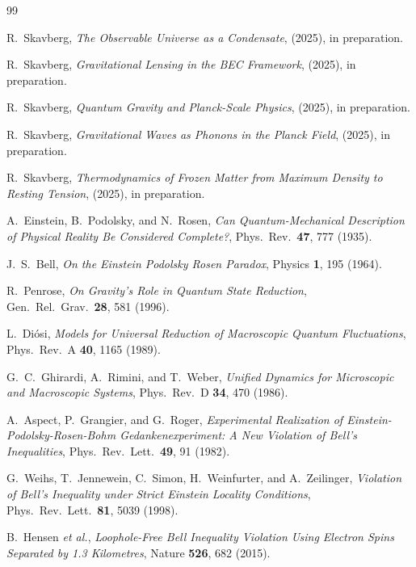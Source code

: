 \documentclass[11pt,a4paper]{article}
\theoremstyle{definition}
\theoremstyle{remark}
\begin{document}
\begin{thebibliography}{99}

R.~Skavberg,
\textit{The Observable Universe as a Condensate},
(2025), in preparation.

R.~Skavberg,
\textit{Gravitational Lensing in the BEC Framework},
(2025), in preparation.

R.~Skavberg,
\textit{Quantum Gravity and Planck-Scale Physics},
(2025), in preparation.

R.~Skavberg,
\textit{Gravitational Waves as Phonons in the Planck Field},
(2025), in preparation.

R.~Skavberg,
\textit{Thermodynamics of Frozen Matter from Maximum Density to Resting Tension},
(2025), in preparation.

A.~Einstein, B.~Podolsky, and N.~Rosen,
\textit{Can Quantum-Mechanical Description of Physical Reality Be Considered Complete?},
Phys.\ Rev.\ \textbf{47}, 777 (1935).

J.~S.~Bell,
\textit{On the Einstein Podolsky Rosen Paradox},
Physics \textbf{1}, 195 (1964).

R.~Penrose,
\textit{On Gravity's Role in Quantum State Reduction},
Gen.\ Rel.\ Grav.\ \textbf{28}, 581 (1996).

L.~Di\'osi,
\textit{Models for Universal Reduction of Macroscopic Quantum Fluctuations},
Phys.\ Rev.\ A \textbf{40}, 1165 (1989).

G.~C.~Ghirardi, A.~Rimini, and T.~Weber,
\textit{Unified Dynamics for Microscopic and Macroscopic Systems},
Phys.\ Rev.\ D \textbf{34}, 470 (1986).

A.~Aspect, P.~Grangier, and G.~Roger,
\textit{Experimental Realization of Einstein-Podolsky-Rosen-Bohm Gedankenexperiment: A New Violation of Bell's Inequalities},
Phys.\ Rev.\ Lett.\ \textbf{49}, 91 (1982).

G.~Weihs, T.~Jennewein, C.~Simon, H.~Weinfurter, and A.~Zeilinger,
\textit{Violation of Bell's Inequality under Strict Einstein Locality Conditions},
Phys.\ Rev.\ Lett.\ \textbf{81}, 5039 (1998).

B.~Hensen \textit{et al.},
\textit{Loophole-Free Bell Inequality Violation Using Electron Spins Separated by 1.3 Kilometres},
Nature \textbf{526}, 682 (2015).


\end{thebibliography}
\end{document}
